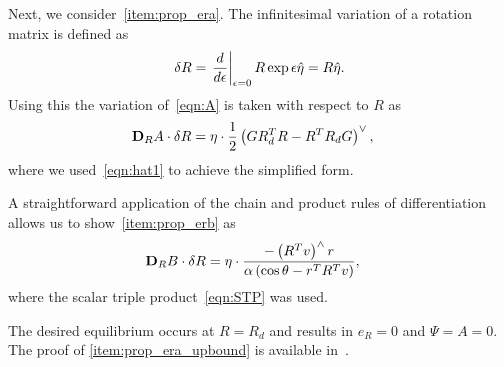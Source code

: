 \documentclass[fleqn]{IJCAS}  %
\begin{document}
\begin{multicols}{2}
Next, we consider~\cref{item:prop_era}.
The infinitesimal variation of a rotation matrix is defined as
\begin{align*}
    \delta R = \left. \frac{d }{d \epsilon} \right|_{\epsilon=0} R \exp{\epsilon \hat{\eta}} = R \hat{\eta} .
\end{align*}
Using this the variation of~\cref{eqn:A} is taken with respect to \( R \) as
\begin{align*}
	\mathbf{D}_{R} A \cdot \delta R &= \eta \cdot \frac{1}{2} \left( G R_d^T R - R^T R_d G\right)^\vee ,
\end{align*}
where we used~\cref{eqn:hat1} to achieve the simplified form.

A straightforward application of the chain and product rules of differentiation allows us to show~\cref{item:prop_erb} as
\begin{align*}
	\mathbf{D}_{R} B \cdot \delta R &=  \eta \cdot \frac{ - \left( R^T v\right)^\wedge r}{\alpha \left(\cos \theta - r^T R^T v \right)} ,
\end{align*}
where the scalar triple product~\cref{eqn:STP} was used.


The desired equilibrium occurs at \( R=R_d\) and results in \( e_R = 0 \) and \( \Psi = A = 0\).
The proof of \cref{item:prop_era_upbound} is available in~\cite{LeeITCST13}.


\end{multicols}
\end{document}
